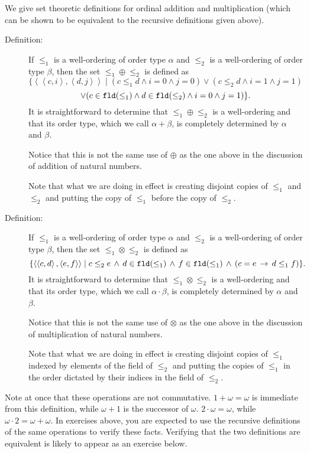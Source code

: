 \documentclass[12pt]{book}
\begin{document}
We give set theoretic definitions for ordinal addition and multiplication (which can be shown to be equivalent to the recursive definitions given above).

\begin{description}

\item[Definition:]  If $\leq_1$ is a well-ordering of order type $\alpha$ and $\leq_2$ is a well-ordering of order type $\beta$, then the set
$\leq_1 \oplus \leq_2$ is defined as $$\{\left<\left<c,i\right>,\left<d,j\right>\right> \mid (c \leq_1 d \wedge i=0 \wedge j=0) \vee (c \leq_2 d \wedge i=1 \wedge j=1)$$ $$ \vee (c \in {\tt fld}(\leq_1) \wedge d \in {\tt fld}(\leq_2) \wedge i=0\wedge j=1)\}.$$  It is straightforward to determine
that $\leq_1 \oplus \leq_2$ is a well-ordering and that its order type, which we call $\alpha+\beta$, is completely determined by $\alpha$ and $\beta$.

Notice that this is not the same use of $\oplus$ as the one above in the discussion of addition of natural numbers.

Note that what we are doing in effect is creating disjoint copies of $\leq_1$ and $\leq_2$ and putting the copy of $\leq_1$ before the copy of $\leq_2$.

\item[Definition:]  If $\leq_1$ is a well-ordering of order type $\alpha$ and $\leq_2$ is a well-ordering of order type $\beta$, then the set
$\leq_1 \otimes \leq_2$ is defined as $$\{\left<\left<c,d\right>,\left<e,f\right>\right>\mid c \leq_2 e \, \wedge \, d \in {\tt fld}(\leq_1)\,  \wedge \, f \in {\tt fld}(\leq_1) \, \wedge\,  (c=e \,\rightarrow \, d \leq_1 f)\}.$$   It is straightforward to determine
that $\leq_1 \otimes \leq_2$ is a well-ordering and that its order type, which we call $\alpha\cdot \beta$, is completely determined by $\alpha$ and $\beta$.

Notice that this is not the same use of $\otimes$ as the one above in the discussion of multiplication of natural numbers.

Note that what we are doing in effect is creating disjoint copies of $\leq_1$ indexed by elements of the field of  $\leq_2$ and putting the copies of $\leq_1$ in the order dictated by their indices in the field of $\leq_2$.

\end{description}

Note at once that these operations are not commutative.  $1+ \omega = \omega$ is immediate from this definition, while $\omega+1$ is the successor of $\omega$.  $2 \cdot \omega = \omega$, while $\omega\cdot 2 = \omega+\omega$.  In exercises above, you are expected to use the recursive definitions of the same operations  to verify these facts.  Verifying that the two definitions are equivalent is likely to appear as an exercise below. 
\end{document}
